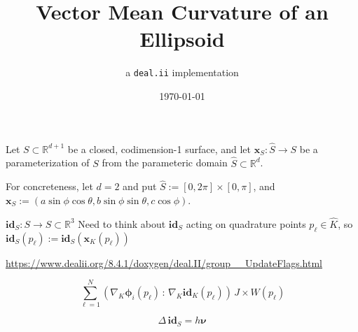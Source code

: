 \documentclass[10pt]{article}
\title{Vector Mean Curvature of an Ellipsoid}
\author{a  \texttt{deal.ii} implementation}
\date{ \today}
\newcommand{\R}{\mathbb{R}}
\begin{document}
\maketitle


Let $S \subset \R^{d+1}$ be a closed, codimension-1 surface, and let
$\mathbf{x}_{S}: \hat{S} \to S$ be a parameterization of $S$ from the
parameteric domain $\hat{S} \subset \R^d$.

For concreteness, let $d = 2$ and put $\hat{S} := [0,2\pi] \times [0,\pi]$, and
$\mathbf{x}_{S} := \left( a \sin \phi \cos \theta, b \sin \phi \sin \theta , c
\cos \phi  \right)$.

$\textbf{id}_{S}: S \to S \subset \R^3$ Need to think about $\textbf{id}_{S}$ acting on
quadrature points $p_{\ell} \in \hat{K}$, so $\textbf{id}_{S}(p_{\ell}) :=
\textbf{id}_{S}(\mathbf{x}_{K}(p_{\ell}))$

\url{https://www.dealii.org/8.4.1/doxygen/deal.II/group\_\_UpdateFlags.html}


\begin{equation}
   \sum_{\ell = 1}^{N} \left( \nabla_{K} \boldsymbol{\phi}_{i}(p_{\ell}) \,:\,
   \nabla_{K} \textbf{id}_{K}(p_{\ell}) \right)
   \, J{\times}W(p_{\ell})
   \label{}
\end{equation}


\begin{equation}
   \Delta \,\textbf{id}_{S} = h\boldsymbol{\nu}
   \label{vector_identity}
\end{equation}


\cite{dealII84}






\newpage


\end{document}

